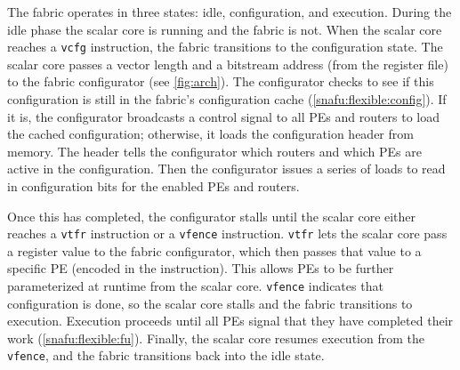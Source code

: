 The \snafuframe fabric operates in three states: idle, configuration, and execution.
% 
During the idle phase the scalar core is running and the fabric is not.
% 
When the scalar core reaches a {\tt vcfg} instruction, the fabric transitions to the configuration state.
% 
The scalar core passes a vector length and a bitstream address (from the register file) to the fabric configurator (see \autoref{fig:arch}).
% 
The configurator checks to see if this configuration is still in the fabric's configuration cache (\autoref{snafu:flexible:config}).
%
If it is, the configurator broadcasts a control signal to all PEs and routers to load the cached configuration;
otherwise, it loads the configuration header from memory.
% 
The header tells the configurator which routers and which PEs are active in the configuration.
% 
Then the configurator issues a series of loads to read in configuration bits for the enabled PEs and routers.
 
Once this has completed, the configurator stalls until the scalar core either reaches a {\tt vtfr} instruction or a {\tt vfence} instruction.
% 
{\tt vtfr} lets the scalar core pass a register value to the fabric configurator, which then passes that value to a specific PE (encoded in the instruction).
% 
This allows PEs to be further parameterized at runtime from the scalar core. %
% 
{\tt vfence} indicates that configuration is done, so the scalar core stalls and the fabric transitions to execution.
% 
Execution proceeds until all PEs signal that they have completed their work (\autoref{snafu:flexible:fu}).
%
Finally, the scalar core resumes execution from the {\tt vfence}, and the fabric transitions back into the idle state.

